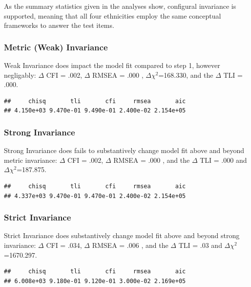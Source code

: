 \documentclass{article}\usepackage[]{graphicx}\usepackage[]{color}
\makeatletter
\newenvironment{kframe}{%
 \def\at@end@of@kframe{}%
 \ifinner\ifhmode%
  \def\at@end@of@kframe{\end{minipage}}%
  \begin{minipage}{\columnwidth}%
 \fi\fi%
 \def\FrameCommand##1{\hskip\@totalleftmargin \hskip-\fboxsep
 \colorbox{shadecolor}{##1}\hskip-\fboxsep
     \hskip-\linewidth \hskip-\@totalleftmargin \hskip\columnwidth}%
 \MakeFramed {\advance\hsize-\width
   \@totalleftmargin\z@ \linewidth\hsize
   \@setminipage}}%
 {\par\unskip\endMakeFramed%
 \at@end@of@kframe}
\newenvironment{knitrout}{}{} %
\makeatother
\begin{document}
As the summary statistics given in the analyses show, configural invariance is supported, meaning that all four ethnicities employ the same conceptual frameworks to answer the test items. 
\subsubsection{Metric (Weak) Invariance}
Weak Invariance does impact the model fit compared to step 1, however negligably: $\Delta$ CFI = .002, $\Delta$ RMSEA = .000 , $\Delta$$\chi^2$=168.330, and the $\Delta$ TLI = .000.

\begin{knitrout}
\color{fgcolor}\begin{kframe}
\begin{verbatim}
##     chisq       tli       cfi     rmsea       aic 
## 4.150e+03 9.470e-01 9.490e-01 2.400e-02 2.154e+05
\end{verbatim}
\end{kframe}
\end{knitrout}


\subsubsection{Strong Invariance}
Strong Invariance does fails to substantively change model fit above and beyond metric invariance: $\Delta$ CFI = .002, $\Delta$ RMSEA = .000 , and the $\Delta$ TLI = .000 and $\Delta$$\chi^2$=187.875. 
\begin{knitrout}
\color{fgcolor}\begin{kframe}
\begin{verbatim}
##     chisq       tli       cfi     rmsea       aic 
## 4.337e+03 9.470e-01 9.470e-01 2.400e-02 2.154e+05
\end{verbatim}
\end{kframe}
\end{knitrout}


\subsubsection{Strict Invariance}
Strict Invariance does substantively change model fit above and beyond strong invariance: $\Delta$ CFI = .034, $\Delta$ RMSEA = .006 , and the $\Delta$ TLI = .03 and $\Delta$$\chi^2$=1670.297. 
\begin{knitrout}
\color{fgcolor}\begin{kframe}
\begin{verbatim}
##     chisq       tli       cfi     rmsea       aic 
## 6.008e+03 9.180e-01 9.120e-01 3.000e-02 2.169e+05
\end{verbatim}
\end{kframe}
\end{knitrout}
\end{document}
